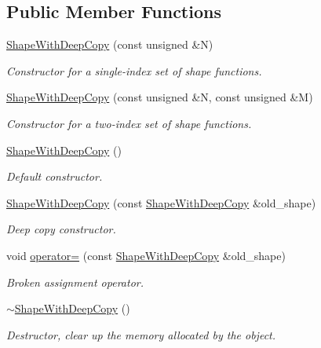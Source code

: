 \subsection*{Public Member Functions}
\begin{DoxyCompactItemize}
\item 
\hyperlink{classoomph_1_1ShapeWithDeepCopy_a1499808202122f3b33c392e67deda9af}{Shape\+With\+Deep\+Copy} (const unsigned \&N)
\begin{DoxyCompactList}\small\item\em Constructor for a single-\/index set of shape functions. \end{DoxyCompactList}\item 
\hyperlink{classoomph_1_1ShapeWithDeepCopy_abf949c57278bc1971de05c23af752b12}{Shape\+With\+Deep\+Copy} (const unsigned \&N, const unsigned \&M)
\begin{DoxyCompactList}\small\item\em Constructor for a two-\/index set of shape functions. \end{DoxyCompactList}\item 
\hyperlink{classoomph_1_1ShapeWithDeepCopy_a1288282b161fe1dac3908af5b09451e2}{Shape\+With\+Deep\+Copy} ()
\begin{DoxyCompactList}\small\item\em Default constructor. \end{DoxyCompactList}\item 
\hyperlink{classoomph_1_1ShapeWithDeepCopy_ae66ab9cb33d966ca340151e6bf6e4c8e}{Shape\+With\+Deep\+Copy} (const \hyperlink{classoomph_1_1ShapeWithDeepCopy}{Shape\+With\+Deep\+Copy} \&old\+\_\+shape)
\begin{DoxyCompactList}\small\item\em Deep copy constructor. \end{DoxyCompactList}\item 
void \hyperlink{classoomph_1_1ShapeWithDeepCopy_a69b0e32d20d1badf674ff46670a7c32f}{operator=} (const \hyperlink{classoomph_1_1ShapeWithDeepCopy}{Shape\+With\+Deep\+Copy} \&old\+\_\+shape)
\begin{DoxyCompactList}\small\item\em Broken assignment operator. \end{DoxyCompactList}\item 
\hyperlink{classoomph_1_1ShapeWithDeepCopy_a6b263cf21ce417463668486e81ec3d60}{$\sim$\+Shape\+With\+Deep\+Copy} ()
\begin{DoxyCompactList}\small\item\em Destructor, clear up the memory allocated by the object. \end{DoxyCompactList}\end{DoxyCompactItemize}
